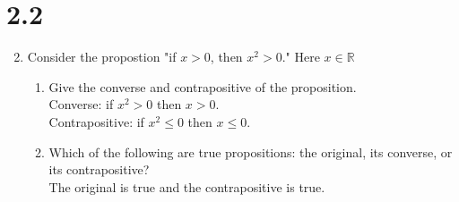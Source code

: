 \documentclass{article}
\newcommand{\R}{\mathbb{R}}
\begin{document}
\section*{2.2} %
\begin{enumerate}
\setcounter{enumi}{1}
\item Consider the propostion "if $x>0$, then $x^2>0$." Here $x\in\R$
	\begin{enumerate}
	\item Give the converse and contrapositive of the proposition.\\
	Converse: if $x^2>0$ then $x>0$.\\
	Contrapositive: if $x^2\leq0$ then $x\leq0$.
	\item Which of the following are true propositions: the original, its converse, or its contrapositive?\\
	The original is true and the contrapositive is true.
	\end{enumerate}

\end{enumerate}
\end{document}
